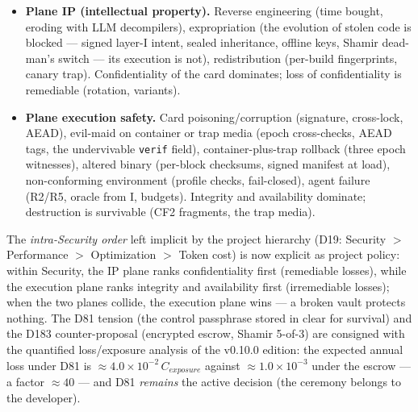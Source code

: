 \documentclass[11pt,a4paper]{article}
\newcommand{\code}[1]{\texttt{\small #1}}
\begin{document}
\begin{itemize}
\item \textbf{Plane IP (intellectual property).} Reverse engineering
(time bought, eroding with LLM decompilers), expropriation (the
evolution of stolen code is blocked --- signed layer-I intent, sealed
inheritance, offline keys, Shamir dead-man's switch --- its execution
is not), redistribution (per-build fingerprints, canary trap).
Confidentiality of the card dominates; loss of confidentiality is
remediable (rotation, variants).
\item \textbf{Plane execution safety.} Card poisoning/corruption
(signature, cross-lock, AEAD), evil-maid on container or trap media
(epoch cross-checks, AEAD tags, the undervivable \code{verif} field),
container-plus-trap rollback (three epoch witnesses), altered binary
(per-block checksums, signed manifest at load), non-conforming
environment (profile checks, fail-closed), agent failure (R2/R5,
oracle from I, budgets). Integrity and availability dominate;
destruction is survivable (CF2 fragments, the trap media).
\end{itemize}

The \emph{intra-Security order} left implicit by the project hierarchy
(D19: Security $>$ Performance $>$ Optimization $>$ Token cost) is now
explicit as project policy: within Security, the IP plane ranks
confidentiality first (remediable losses), while the execution plane
ranks integrity and availability first (irremediable losses); when the
two planes collide, the execution plane wins --- a broken vault protects
nothing. The D81 tension (the control passphrase stored in clear for
survival) and the D183 counter-proposal (encrypted escrow, Shamir
5-of-3) are consigned with the quantified loss/exposure analysis of the
v0.10.0 edition: the expected annual loss under D81 is
$\approx 4.0 \times 10^{-2}\,C_{exposure}$ against
$\approx 1.0 \times 10^{-3}$ under the escrow --- a factor $\approx 40$
--- and D81 \emph{remains} the active decision (the ceremony belongs to
the developer).
\end{document}
